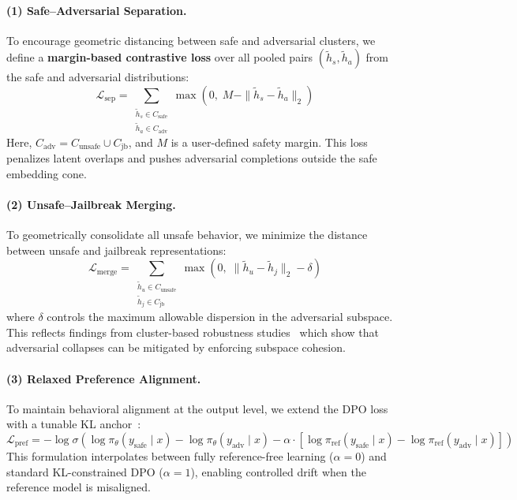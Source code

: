 \paragraph{(1) Safe--Adversarial Separation.}
To encourage geometric distancing between safe and adversarial clusters, we define a \textbf{margin-based contrastive loss} over all pooled pairs \((\tilde{h}_s, \tilde{h}_a)\) from the safe and adversarial distributions:
\[
\mathcal{L}_{\mathrm{sep}} = \sum_{\substack{\tilde{h}_s \in C_{\mathrm{safe}} \\ \tilde{h}_a \in C_{\mathrm{adv}}}} \max\left(0,\; M - \|\tilde{h}_s - \tilde{h}_a\|_2\right)
\]
Here, \( C_{\mathrm{adv}} = C_{\mathrm{unsafe}} \cup C_{\mathrm{jb}} \), and \( M \) is a user-defined safety margin. This loss penalizes latent overlaps and pushes adversarial completions outside the safe embedding cone.

\paragraph{(2) Unsafe--Jailbreak Merging.}
To geometrically consolidate all unsafe behavior, we minimize the distance between unsafe and jailbreak representations:
\[
\mathcal{L}_{\mathrm{merge}} = \sum_{\substack{\tilde{h}_u \in C_{\mathrm{unsafe}} \\ \tilde{h}_j \in C_{\mathrm{jb}}}} \max\left(0,\; \|\tilde{h}_u - \tilde{h}_j\|_2 - \delta \right)
\]
where \( \delta \) controls the maximum allowable dispersion in the adversarial subspace. This reflects findings from cluster-based robustness studies~\cite{carlini2023extracting, xie2021improving} which show that adversarial collapses can be mitigated by enforcing subspace cohesion.

\paragraph{(3) Relaxed Preference Alignment.}
To maintain behavioral alignment at the output level, we extend the DPO loss with a tunable KL anchor~\cite{wu2024generalized, chen2023epsilon}:
\[
\mathcal{L}_{\mathrm{pref}} = -\log \sigma\left(
\log \pi_\theta(y_{\mathrm{safe}} \mid x) -
\log \pi_\theta(y_{\mathrm{adv}} \mid x) -
\alpha \cdot \left[
\log \pi_{\mathrm{ref}}(y_{\mathrm{safe}} \mid x) -
\log \pi_{\mathrm{ref}}(y_{\mathrm{adv}} \mid x)
\right]
\right)
\]
This formulation interpolates between fully reference-free learning (\( \alpha = 0 \)) and standard KL-constrained DPO (\( \alpha = 1 \)), enabling controlled drift when the reference model is misaligned.

